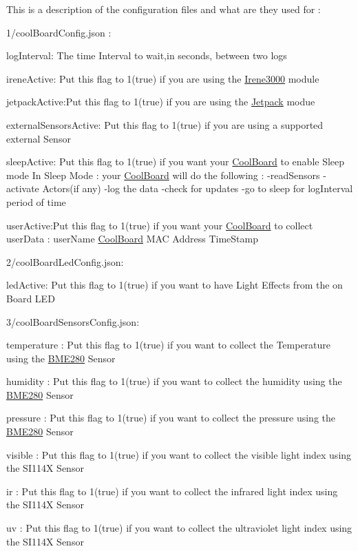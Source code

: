 This is a description of the configuration files and what are they used for \+:

1/cool\+Board\+Config.\+json \+:

log\+Interval\+: The time Interval to wait,in seconds, between two logs

irene\+Active\+: Put this flag to 1(true) if you are using the \hyperlink{class_irene3000}{Irene3000} module

jetpack\+Active\+:Put this flag to 1(true) if you are using the \hyperlink{class_jetpack}{Jetpack} modue

external\+Sensors\+Active\+: Put this flag to 1(true) if you are using a supported external Sensor

sleep\+Active\+: Put this flag to 1(true) if you want your \hyperlink{class_cool_board}{Cool\+Board} to enable Sleep mode In Sleep Mode \+: your \hyperlink{class_cool_board}{Cool\+Board} will do the following \+: -\/read\+Sensors -\/activate Actors(if any) -\/log the data -\/check for updates -\/go to sleep for log\+Interval period of time

user\+Active\+:Put this flag to 1(true) if you want your \hyperlink{class_cool_board}{Cool\+Board} to collect user\+Data \+: user\+Name \hyperlink{class_cool_board}{Cool\+Board} M\+AC Address Time\+Stamp

2/cool\+Board\+Led\+Config.\+json\+:

led\+Active\+: Put this flag to 1(true) if you want to have Light Effects from the on Board L\+ED

3/cool\+Board\+Sensors\+Config.\+json\+:

temperature \+: Put this flag to 1(true) if you want to collect the Temperature using the \hyperlink{class_b_m_e280}{B\+M\+E280} Sensor

humidity \+: Put this flag to 1(true) if you want to collect the humidity using the \hyperlink{class_b_m_e280}{B\+M\+E280} Sensor

pressure \+: Put this flag to 1(true) if you want to collect the pressure using the \hyperlink{class_b_m_e280}{B\+M\+E280} Sensor

visible \+: Put this flag to 1(true) if you want to collect the visible light index using the S\+I114X Sensor

ir \+: Put this flag to 1(true) if you want to collect the infrared light index using the S\+I114X Sensor

uv \+: Put this flag to 1(true) if you want to collect the ultraviolet light index using the S\+I114X Sensor

